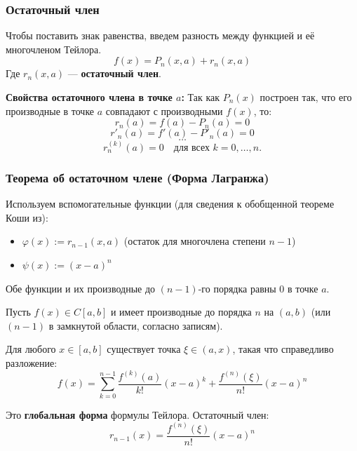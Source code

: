 \subsubsection*{Остаточный член}

Чтобы поставить знак равенства, введем разность между функцией и её многочленом Тейлора.
\[ f(x) = P_n(x, a) + r_n(x, a) \]
Где $r_n(x, a)$ — \textbf{остаточный член}.

\textbf{Свойства остаточного члена в точке $a$:}
Так как $P_n(x)$ построен так, что его производные в точке $a$ совпадают с производными $f(x)$, то:
\[ r_n(a) = f(a) - P_n(a) = 0 \]
\[ r'_n(a) = f'(a) - P'_n(a) = 0 \]
\[ \dots \]
\[ r^{(k)}_n(a) = 0 \quad \text{для всех } k = 0, \dots, n. \]

\subsubsection*{Теорема об остаточном члене (Форма Лагранжа)}

Используем вспомогательные функции (для сведения к обобщенной теореме Коши из):
\begin{itemize}
    \item $\varphi(x) := r_{n-1}(x, a)$ (остаток для многочлена степени $n-1$)
    \item $\psi(x) := (x-a)^n$
\end{itemize}
Обе функции и их производные до $(n-1)$-го порядка равны 0 в точке $a$.

\begin{tcolorbox}[title=Теорема (Остаток в форме Лагранжа)]
    Пусть $f(x) \in C[a, b]$ и имеет производные до порядка $n$ на $(a, b)$ (или $(n-1)$ в замкнутой области, согласно записям).
    
    Для любого $x \in [a, b]$ существует точка $\xi \in (a, x)$, такая что справедливо разложение:
    \[ f(x) = \sum_{k=0}^{n-1} \frac{f^{(k)}(a)}{k!}(x-a)^k + \frac{f^{(n)}(\xi)}{n!}(x-a)^n \]
\end{tcolorbox}

Это \textbf{глобальная форма} формулы Тейлора.
Остаточный член:
\[ r_{n-1}(x) = \frac{f^{(n)}(\xi)}{n!}(x-a)^n \]


